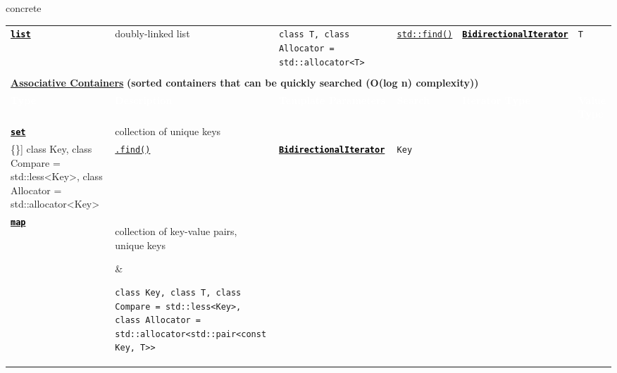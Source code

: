\documentclass{beamer}
\newcommand\ccode[1]{\textcolor{black}{\texttt{\textbf{#1}}}}
\newcommand\hcode[1]{\textcolor{black}{\texttt{\textbf{#1}}}}
\newcommand\codel[1]{\texttt{#1}}
\newcommand\htblt[1]{\textcolor{purpleth}{\textbf{\Large{#1}}}}
\begin{document}
\begin{textblock}{65.2}
\begin{beamercolorbox}[sep=2mm,wd=65.2cm,rounded=true]{concrete}
\begin{tabular*}{\linewidth}{l  l  l  l  l  l}
      \href{http://en.cppreference.com/w/cpp/container/list}{\hcode{list}} & doubly-linked list & \codel{class T, class Allocator = std::allocator<T>} & \href{http://en.cppreference.com/w/cpp/algorithm/find}{\codel{std::find()}} & \href{http://en.cppreference.com/w/cpp/concept/BidirectionalIterator}{\ccode{BidirectionalIterator}} & \codel{T} \\
      \multicolumn{6}{l}{} \\
      \multicolumn{6}{l}{\htblt{\href{http://en.cppreference.com/w/cpp/container}{Associative Containers}}\hspace*{1em} \textcolor{purpleth}{\large{\textbf{(sorted containers that can be quickly searched (O(log n) complexity))}}}} \\
      \cellcolor{purpleth}\textcolor{white}{\bfseries{Type}} & \cellcolor{purpleth}\textcolor{white}{\bfseries{Description}} & \cellcolor{purpleth}\textcolor{white}{\bfseries{Template Parameters}} & \cellcolor{purpleth}\textcolor{white}{\bfseries{Search}} & \cellcolor{purpleth}\textcolor{white}{\bfseries{Iterator Type}} & \cellcolor{purpleth}\textcolor{white}{\bfseries{Value Type}} \\
      \href{http://en.cppreference.com/w/cpp/container/set}{\hcode{set}} & collection of unique keys
      & \begin{minipage}[h]{11.6in}
          \linespread{0.5}
          \begin{Verbatim}[commandchars=\\\{\}]
class Key, class Compare = std::less<Key>, class Allocator = std::allocator<Key>
            \end{Verbatim}
      \end{minipage} & \href{http://en.cppreference.com/w/cpp/container/set/find}{\codel{.find()}} & \href{http://en.cppreference.com/w/cpp/concept/BidirectionalIterator}{\ccode{BidirectionalIterator}} & \codel{Key} \\
      \rowcolor{white}
      \href{http://en.cppreference.com/w/cpp/container/map}{\hcode{map}} & \parbox{8cm}{\linespread{0.5}\selectfont collection of key-value pairs, unique keys}
      & \begin{minipage}{8.7in}
          \linespread{0.5}
          \begin{Verbatim}[commandchars=\\\{\}]
class Key, class T, class Compare = std::less<Key>,
class Allocator = std::allocator<std::pair<const Key, T>>
          \end{Verbatim}

\end{minipage}
\end{tabular*}
\end{beamercolorbox}
\end{textblock}
\end{document}
